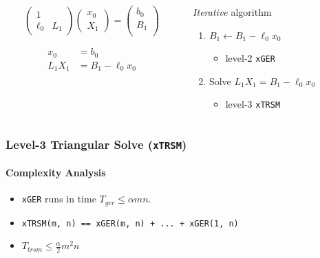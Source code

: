 \documentclass[xcolor={rgb,x11names,svgnames},rgb,x11names,svgnames]{beamer}
\begin{document}
\begin{frame}[label=trsm,fragile]
  \begin{columns}
    \begin{column}{5cm}
\[
     \begin{pmatrix}
       1 &  \\
       \ell_{0} & L_{1} 
     \end{pmatrix}
     \begin{pmatrix}
       x_{0} \\
       X_{1}  
     \end{pmatrix}
     =
     \begin{pmatrix}
     b_{0} \\
     B_{1} \\
   \end{pmatrix}
 \]

   \vspace{-0.5cm}
   
   \begin{align*}     
     x_{0} &= b_{0} \\
     L_{1} X_1 &= B_{1} - \ell_{0} x_{0}
   \end{align*}
      
    \end{column}
    \begin{column}{5.5cm}

 \begin{block}{\emph{Iterative} algorithm}
   \begin{enumerate}
   \item<4-> $B_{1} \gets B_{1} - \ell_{0} x_{0}$
     \begin{itemize}
     \item level-2 \texttt{xGER}
     \end{itemize}
     
   \item<6-> Solve $L_{1} X_1 = B_{1} - \ell_{0} x_{0}$
     \begin{itemize}
     \item level-3 \texttt{xTRSM}
     \end{itemize}
   \end{enumerate}
 \end{block}

\end{column}
\end{columns}
\end{frame}


\begin{frame}[label=trsm,fragile]
  \frametitle{Level-3 Triangular Solve (\texttt{xTRSM})}
  \framesubtitle{Complexity Analysis}
  
  \begin{itemize}
  \item \texttt{xGER} runs in time $T_{ger} \leq \alpha m n$.
  \item \texttt{xTRSM(m, n) == xGER(m, n) + ... + xGER(1, n)}
  \item $T_{trsm} \leq \frac{\alpha}{2} m^2 n$
  \end{itemize}

\end{frame}
\end{document}
